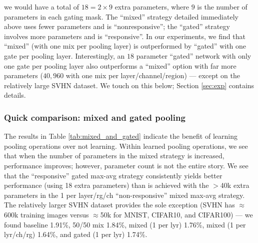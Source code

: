 \documentclass[twoside]{article}
\begin{document}
we would have a total of $18 = 2\times 9$ extra parameters, where $9$ is the number 
of parameters in each gating mask. The ``mixed'' strategy detailed immediately above uses fewer parameters and  
is ``nonresponsive''; the ``gated'' strategy involves more parameters and is ``responsive''. 
In our experiments, we find that ``mixed'' (with one mix per pooling layer) is outperformed
by ``gated'' with one gate per pooling layer. Interestingly, an $18$ parameter ``gated'' network with only one gate 
per pooling layer also outperforms  a ``mixed'' option with far more parameters ($40,\!960$ with one mix per 
layer/channel/region) --- except on the relatively 
large SVHN dataset. We touch on this below; Section \ref{sec:exp} contains details.
\vspace{-3mm}
\subsubsection{Quick comparison: mixed and gated pooling}
\vspace{-2mm}
The results in Table \ref{tab:mixed_and_gated} indicate the benefit of learning pooling operations
over not learning. Within learned pooling operations, we see that when the number of 
parameters in the mixed strategy is increased, performance improves; however, parameter 
count is not the entire story. We see that the ``responsive'' gated max-avg strategy 
consistently yields better performance (using 18 extra parameters) than is achieved with the $>$40k
extra parameters in the 1 per layer/rg/ch ``non-responsive'' mixed max-avg strategy. The relatively 
larger SVHN dataset provides the sole exception (SVHN has $\approx$600k training images versus 
$\approx$50k for MNIST, CIFAR10, and CIFAR100) --- we found baseline 1.91\%, 50/50 mix 1.84\%, mixed (1 per lyr) 1.76\%, mixed (1 per lyr/ch/rg) 1.64\%, and gated (1 per lyr) 1.74\%.
\end{document}
